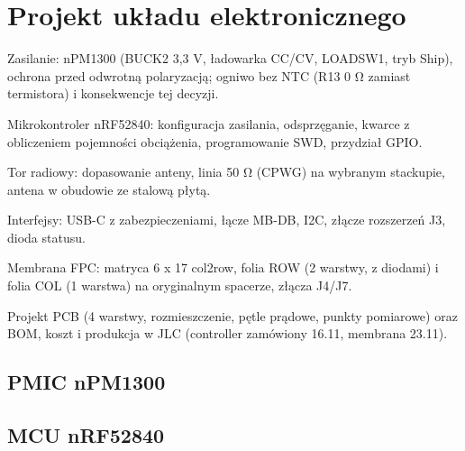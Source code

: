 \chapter{Projekt układu elektronicznego}\label{ch:elektronika}
\begin{zawartosc}
  \item Zasilanie: nPM1300 (BUCK2 3,3 V, ładowarka CC/CV, LOADSW1, tryb Ship), ochrona przed odwrotną polaryzacją; ogniwo bez NTC (R13 0 Ω zamiast termistora) i konsekwencje tej decyzji.
  \item Mikrokontroler nRF52840: konfiguracja zasilania, odsprzęganie, kwarce z obliczeniem pojemności obciążenia, programowanie SWD, przydział GPIO.
  \item Tor radiowy: dopasowanie anteny, linia 50 Ω (CPWG) na wybranym stackupie, antena w obudowie ze stalową płytą.
  \item Interfejsy: USB-C z zabezpieczeniami, łącze MB-DB, I2C, złącze rozszerzeń J3, dioda statusu.
  \item Membrana FPC: matryca 6 x 17 col2row, folia ROW (2 warstwy, z diodami) i folia COL (1 warstwa) na oryginalnym spacerze, złącza J4/J7.
  \item Projekt PCB (4 warstwy, rozmieszczenie, pętle prądowe, punkty pomiarowe) oraz BOM, koszt i produkcja w JLC (controller zamówiony 16.11, membrana 23.11).
\end{zawartosc}

\section{PMIC nPM1300}\label{sec:pmic}

\section{MCU nRF52840}\label{sec:mcu}

